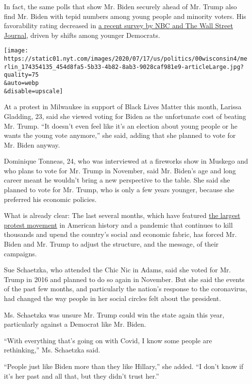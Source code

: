 In fact, the same polls that show Mr. Biden securely ahead of Mr. Trump
also find Mr. Biden with tepid numbers among young people and minority
voters. His favorability rating decreased in
\href{https://www.nbcnews.com/politics/meet-the-press/trump-has-50-percent-problem-new-nbc-news-wsj-poll-n1234020}{a
recent survey by NBC and The Wall Street Journal}, driven by shifts
among younger Democrats.

\texttt{[image: https://static01.nyt.com/images/2020/07/17/us/politics/00wisconsin4/merlin\_174354135\_454d8fa5-5b33-4b82-8ab3-9028caf981e9-articleLarge.jpg?quality=75\\\&auto=webp\\\&disable=upscale]}

At a protest in Milwaukee in support of Black Lives Matter this month,
Larissa Gladding, 23, said she viewed voting for Biden as the
unfortunate cost of beating Mr. Trump. ``It doesn't even feel like it's
an election about young people or he wants the young vote anymore,'' she
said, adding that she planned to vote for Mr. Biden anyway.

Dominique Tonneas, 24, who was interviewed at a fireworks show in
Muskego and who plans to vote for Mr. Trump in November, said Mr.
Biden's age and long career meant he wouldn't bring a new perspective to
the table. She said she planned to vote for Mr. Trump, who is only a few
years younger, because she preferred his economic policies.

What is already clear: The last several months, which have featured
\href{https://www.nytimes.com/interactive/2020/07/03/us/george-floyd-protests-crowd-size.html}{the
largest protest movement} in American history and a pandemic that
continues to kill thousands and upend the country's social and economic
fabric, has forced Mr. Biden and Mr. Trump to adjust the structure, and
the message, of their campaigns.

Sue Schaetzka, who attended the Chic Nic in Adams, said she voted for
Mr. Trump in 2016 and planned to do so again in November. But she said
the events of the past few months, and particularly the nation's
response to the coronavirus, had changed the way people in her social
circles felt about the president.

Ms. Schaetzka was unsure Mr. Trump could win the state again this year,
particularly against a Democrat like Mr. Biden.

``With everything that's going on with Covid, I know some people are
rethinking,'' Ms. Schaetzka said.

``People just like Biden more than they like Hillary,'' she added. ``I
don't know if it's her past and all that, but they didn't trust her.''

